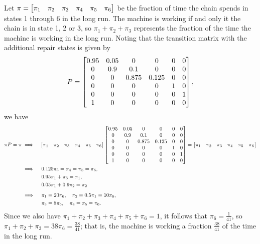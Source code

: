 \documentclass{homework}
\begin{document}
	\question 
	\begin{alphaparts}
		\questionpart Let $\pi = \left[\begin{matrix}\pi_1 & \pi_2 & \pi_3 & \pi_4 & \pi_5 &\pi_6\end{matrix}\right]$ be the fraction of time the chain spends in states 1 through 6 in the long run. The machine is working if and only it the chain is in state 1, 2 or 3, so $\pi_1 + \pi_2 + \pi_3$ represents the fraction of the time the machine is working in the long run. Noting that the transition matrix with the additional repair states is given by
		\begin{equation*}
			P = \left[\begin{matrix}
				0.95 & 0.05 & 0 & 0 & 0 & 0 \\
				0 & 0.9 & 0.1 & 0 & 0 & 0 \\
				0 & 0 & 0.875 & 0.125 & 0  & 0\\
				0 & 0 & 0 & 0 & 1 & 0 \\
				0 & 0 & 0 & 0 & 0 & 1 \\
				1 & 0 & 0 & 0 & 0 & 0
			\end{matrix}\right],
		\end{equation*}
		we have
		\begin{alignat*}{2}
			\pi P = \pi &\implies  &&\left[\begin{matrix}\pi_1 & \pi_2 & \pi_3 & \pi_4 & \pi_5 &\pi_6\end{matrix}\right]\left[\begin{matrix}
				0.95 & 0.05 & 0 & 0 & 0 & 0 \\
				0 & 0.9 & 0.1 & 0 & 0 & 0 \\
				0 & 0 & 0.875 & 0.125 & 0  & 0\\
				0 & 0 & 0 & 0 & 1 & 0 \\
				0 & 0 & 0 & 0 & 0 & 1 \\
				1 & 0 & 0 & 0 & 0 & 0
			\end{matrix}\right]= \left[\begin{matrix}\pi_1 & \pi_2 & \pi_3 & \pi_4 & \pi_5 &\pi_6\end{matrix}\right] \\
			& \implies &&\; 0.125\pi_3 = \pi_4 = \pi_5 = \pi_6, \\
			&&&\; 0.95\pi_1 + \pi_6 = \pi_1, \\
			&&&\; 0.05\pi_1 + 0.9\pi_2 = \pi_2 \\[0.5em]
			&\implies&&\; \pi_1 = 20\pi_6, \quad \pi_2 = 0.5\pi_1 = 10\pi_6, \\
			&&&\; \pi_3 = 8\pi_6, \quad \pi_4 = \pi_5 = \pi_6.
		\end{alignat*}
		Since we also have $\pi_1 + \pi_2 + \pi_3 + \pi_4 + \pi_5 + \pi_6 = 1$, it follows that $\pi_6 = \frac{1}{41}$, so $\pi_1 + \pi_2 + \pi_3 = 38\pi_6 = \frac{38}{41}$; that is, the machine is working a fraction $\frac{38}{41}$ of the time in the long run.
		

\end{alphaparts}
\end{document}
